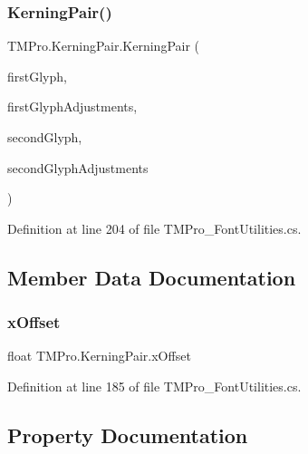 \subsubsection{\texorpdfstring{KerningPair()}{KerningPair()}\hspace{0.1cm}{\footnotesize\ttfamily [3/3]}}
{\footnotesize\ttfamily T\+M\+Pro.\+Kerning\+Pair.\+Kerning\+Pair (\begin{DoxyParamCaption}\item[{uint}]{first\+Glyph,  }\item[{\mbox{\hyperlink{struct_t_m_pro_1_1_glyph_value_record}{Glyph\+Value\+Record}}}]{first\+Glyph\+Adjustments,  }\item[{uint}]{second\+Glyph,  }\item[{\mbox{\hyperlink{struct_t_m_pro_1_1_glyph_value_record}{Glyph\+Value\+Record}}}]{second\+Glyph\+Adjustments }\end{DoxyParamCaption})}



Definition at line 204 of file T\+M\+Pro\+\_\+\+Font\+Utilities.\+cs.



\subsection{Member Data Documentation}
\mbox{\label{class_t_m_pro_1_1_kerning_pair_ab6e227878e0f55e26103c94914384617}} 
\subsubsection{\texorpdfstring{xOffset}{xOffset}}
{\footnotesize\ttfamily float T\+M\+Pro.\+Kerning\+Pair.\+x\+Offset}



Definition at line 185 of file T\+M\+Pro\+\_\+\+Font\+Utilities.\+cs.



\subsection{Property Documentation}
\mbox{\label{class_t_m_pro_1_1_kerning_pair_af9aa2a18d3992d1fa6080e44c69fe7c5}} 
